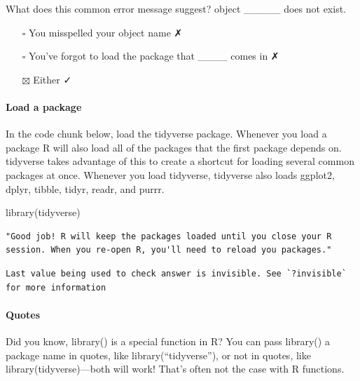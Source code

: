 \documentclass[
]{article}
\newenvironment{Shaded}{\begin{snugshade}}{\end{snugshade}}
\newcommand{\FunctionTok}[1]{\textcolor[rgb]{0.00,0.00,0.00}{#1}}
\newcommand{\NormalTok}[1]{#1}
\providecommand{\tightlist}{%
  \setlength{\itemsep}{0pt}\setlength{\parskip}{0pt}}
\begin{document}
What does this common error message suggest? object \_\_\_\_\_ does not
exist.

\begin{itemize}
\tightlist
\item[$\square$]
  You misspelled your object name ✗
\item[$\square$]
  You've forgot to load the package that \_\_\_\_ comes in ✗
\item[$\boxtimes$]
  Either ✓
\end{itemize}

\hypertarget{load-a-package}{%
\paragraph{Load a package}\label{load-a-package}}

In the code chunk below, load the tidyverse package. Whenever you load a
package R will also load all of the packages that the first package
depends on. tidyverse takes advantage of this to create a shortcut for
loading several common packages at once. Whenever you load tidyverse,
tidyverse also loads ggplot2, dplyr, tibble, tidyr, readr, and purrr.

\begin{Shaded}
\begin{Highlighting}[]
\FunctionTok{library}\NormalTok{(tidyverse)}
\end{Highlighting}
\end{Shaded}

\begin{verbatim}
"Good job! R will keep the packages loaded until you close your R session. When you re-open R, you'll need to reload you packages."
\end{verbatim}

\begin{verbatim}
Last value being used to check answer is invisible. See `?invisible` for more information
\end{verbatim}

\hypertarget{quotes}{%
\paragraph{Quotes}\label{quotes}}

Did you know, library() is a special function in R? You can pass
library() a package name in quotes, like library(``tidyverse''), or not
in quotes, like library(tidyverse)---both will work! That's often not
the case with R functions.
\end{document}
